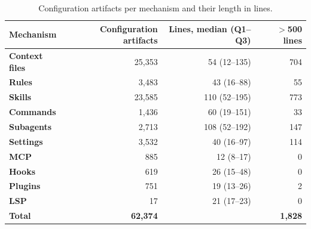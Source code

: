 \begin{table}[t]
\centering
\small
\caption{Configuration artifacts per mechanism and their length in lines.}
\label{tab:content-quality}
\begin{tabular}{lrrr}
\toprule
\textbf{Mechanism} & \textbf{Configuration artifacts} & \textbf{Lines, median (Q1--Q3)} & \textbf{$>$500 lines} \\
\midrule
\textbf{Context files} & 25,353 & 54 (12--135) & 704 \\
\textbf{Rules} & 3,483 & 43 (16--88) & 55 \\
\textbf{Skills} & 23,585 & 110 (52--195) & 773 \\
\textbf{Commands} & 1,436 & 60 (19--151) & 33 \\
\textbf{Subagents} & 2,713 & 108 (52--192) & 147 \\
\textbf{Settings} & 3,532 & 40 (16--97) & 114 \\
\textbf{MCP} & 885 & 12 (8--17) & 0 \\
\textbf{Hooks} & 619 & 26 (15--48) & 0 \\
\textbf{Plugins} & 751 & 19 (13--26) & 2 \\
\textbf{LSP} & 17 & 21 (17--23) & 0 \\
\midrule
\textbf{Total} & \textbf{62,374} & & \textbf{1,828} \\
\bottomrule
\end{tabular}
\end{table}
